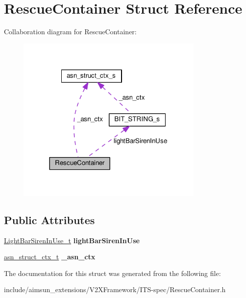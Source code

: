 \hypertarget{structRescueContainer}{}\section{Rescue\+Container Struct Reference}
\label{structRescueContainer}


Collaboration diagram for Rescue\+Container\+:\nopagebreak
\begin{figure}[H]
\begin{center}
\leavevmode
\includegraphics[width=260pt]{structRescueContainer__coll__graph}
\end{center}
\end{figure}
\subsection*{Public Attributes}
\begin{DoxyCompactItemize}
\item 
\hyperlink{structBIT__STRING__s}{Light\+Bar\+Siren\+In\+Use\+\_\+t} {\bfseries light\+Bar\+Siren\+In\+Use}\hypertarget{structRescueContainer_adc0792c7a80262c994617e5c016b5d26}{}\label{structRescueContainer_adc0792c7a80262c994617e5c016b5d26}

\item 
\hyperlink{structasn__struct__ctx__s}{asn\+\_\+struct\+\_\+ctx\+\_\+t} {\bfseries \+\_\+asn\+\_\+ctx}\hypertarget{structRescueContainer_a9f0adfb00ae12255ca7106d581a02852}{}\label{structRescueContainer_a9f0adfb00ae12255ca7106d581a02852}

\end{DoxyCompactItemize}


The documentation for this struct was generated from the following file\+:\begin{DoxyCompactItemize}
\item 
include/aimsun\+\_\+extensions/\+V2\+X\+Framework/\+I\+T\+S-\/spec/Rescue\+Container.\+h\end{DoxyCompactItemize}
